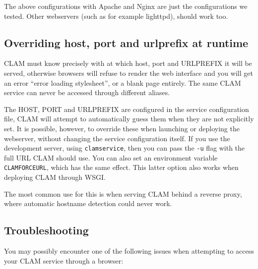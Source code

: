 \documentclass[a4paper,12pt,twoside,openright]{report}
\begin{document}
The above configurations with Apache and Nginx are just the configurations we
tested. Other webservers (such as for example lighttpd), should work too. 

\subsection{Overriding host, port and urlprefix at runtime}

CLAM must know precisely with at which host, port and URLPREFIX it will be
served, otherwise browsers will refuse to render the web interface and you will
get an error ``error loading stylesheet'', or a blank page entirely.  The same
CLAM service can never be accessed through different aliases.

The HOST, PORT and URLPREFIX are configured in the service configuration file,
CLAM will attempt to automatically guess them when they are not explicitly set.
It is possible, however, to override these when launching or deploying the
webserver, without changing the service configuration itself. If you use the
development server, using \texttt{clamservice}, then you can pass the
\texttt{-u} flag with the full URL CLAM should use. You can also set an
environment variable \texttt{CLAMFORCEURL}, which has the same effect. This
latter option also works when deploying CLAM through WSGI.

The most common use for this is when serving CLAM behind a reverse proxy, where
automatic hostname detection could never work.

\subsection{Troubleshooting}

You may possibly encounter one of the following issues when attempting to access your CLAM service through a browser:
\end{document}

